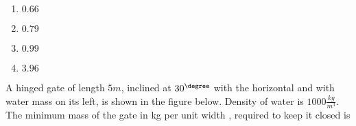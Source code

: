     \begin{multicols}{4}
        \begin{enumerate}
            \item $0.66$
            \item $0.79$
            \item $0.99$
            \item $3.96$
        \end{enumerate}
    \end{multicols}

    \item 
    A hinged gate of length $5 m$, inclined at $30^{\degree}$ with the horizontal and with water mass on its left, is shown in the figure below. Density of water is $1000 \frac{kg}{m^3}$. The minimum mass of the gate in kg per unit width , required to keep it closed is


